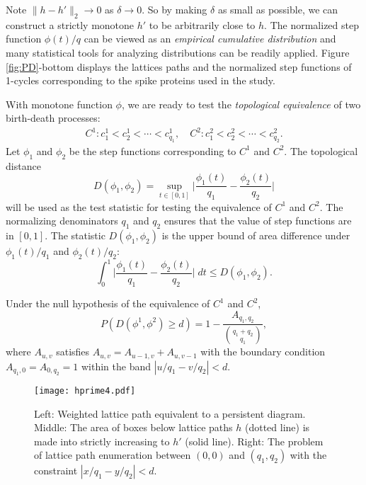 \documentclass{llncs}
\newcommand{\bq}{\begin{eqnarray*}}
\newcommand{\eq}{\end{eqnarray*}}
\begin{document}
Note $ \| h - h ' \|_2 \to 0$ as $\delta \to 0$. So by making $\delta$ as small as possible, we can construct a strictly monotone $h'$ to be arbitrarily close to $h$. The normalized step function $\phi(t)/q$ can be viewed as an {\em empirical cumulative distribution} and many statistical tools for analyzing distributions can be readily applied. Figure \ref{fig:PD}-bottom displays the lattices paths and the normalized step functions of 1-cycles corresponding to the spike proteins used in the study. 


With monotone function $\phi$, we are ready to test the {\em topological equivalence} of two birth-death processes:
\bq C^1 : c^1_1 < c^1_2 < \cdots < c^1_{q_1}, \quad C^2 :  c^2_1 < c^2_2 < \cdots < c^2_{q_2}.
\eq
Let $\phi_1$ and $\phi_2$ be the step functions corresponding to $C^1$ and $C^2$. The topological distance
$$D(\phi_1,\phi_2) = \sup_{t \in [0,1]} \Big| \frac{\phi_1 (t)}{q_1} - \frac{\phi_2 (t)}{q_2} \Big|$$
will be used as the test statistic for testing the equivalence of $C^1$ and $C^2$. The normalizing denominators $q_1$ and $q_2$ ensures that the value of step  
functions are in $[0,1]$. The statistic $D(\phi_1,\phi_2)$ is the upper bound of area difference under $\phi_1(t)/q_1$ and $\phi_2(t)/q_2$:
$$\int_0^1 \Big| \frac{\phi_1 (t)}{q_1} - \frac{\phi_2(t)}{q_2} \Big| \; dt \leq D(\phi_1,\phi_2).$$
\begin{theorem} Under the null hypothesis of the equivalence of $C^1$ and $C^2$,
$$P( D(\phi^1,\phi^2) \geq d )   = 1 - \frac{A_{q_1,q_2}}{{q_1 + q_2 \choose q_1
}},$$
where $A_{u,v}$ satisfies $A_{u,v} = A_{u-1,v} + A_{u, v-1}$
with the boundary condition $A_{q_1,0}=A_{0,q_2}=1$ within the band $|u/q_1 - v/q_2| < d$. 
\label{thm:null}
\end{theorem}


\begin{figure}[t]
\centering
\texttt{[image: hprime4.pdf]}
\caption{\small Left: Weighted lattice path equivalent to a persistent diagram. Middle: The area of boxes below lattice paths $h$ (dotted line) is made into strictly increasing to $h'$ (solid line). Right: The problem of lattice path enumeration between $(0,0)$ and $(q_1,q_2)$ with the constraint $|x/q_1-y/q_2| <d$.}
\label{fig:hprime}
\end{figure}
\end{document}
